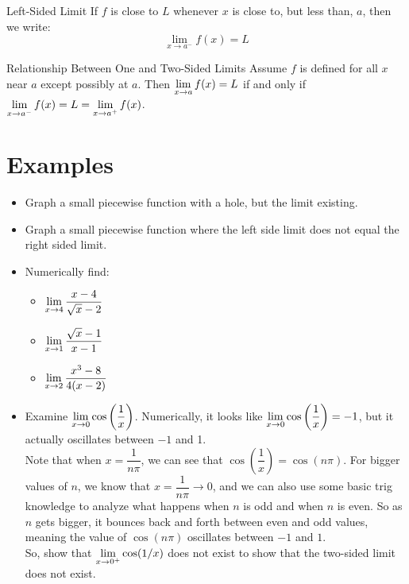 \begin{defn}{Left-Sided Limit}
If $f$ is close to $L$ whenever $x$ is close to, but less than, $a$, then we write:
\[ \lim_{x\to a^-} f(x)=L\]
\end{defn}

\begin{thm}{Relationship Between One and Two-Sided Limits}
Assume $f$ is defined for all $x$ near $a$ except possibly at $a$. Then $\displaystyle \lim_{x\to a} f(x) = L$ if and only if $\displaystyle \lim_{x\to a^-}f(x) = L = \displaystyle \lim_{x\to a^+} f(x)$.
\end{thm}

\section*{Examples}

\begin{itemize}
\item Graph a small piecewise function with a hole, but the limit existing.
\item Graph a small piecewise function where the left side limit does not equal the right sided limit.
\item Numerically find:
\begin{multicols}{3}
\begin{itemize}
  \item $\displaystyle \lim_{x\to 4} \dfrac{x-4}{\sqrt{x}-2}$
  \item $\displaystyle \lim_{x\to 1} \dfrac{\sqrt{x}-1}{x-1}$
  \item $\displaystyle \lim_{x\to 2} \dfrac{x^3-8}{4(x-2)}$
\end{itemize}
\end{multicols}
\item Examine $\displaystyle \lim_{x\to 0} \cos\left(\dfrac{1}{x}\right)$. Numerically, it looks like $\displaystyle \lim_{x\to 0} \cos\left(\dfrac{1}{x}\right)=-1$, but it actually oscillates between $-1$ and 1.\\
Note that when $x=\dfrac{1}{n\pi}$, we can see that  $\cos\left(\dfrac{1}{x}\right)=\cos(n\pi)$. For bigger values of $n$, we know that $x=\dfrac{1}{n\pi} \to 0$, and we can also use some basic trig knowledge to analyze what happens when $n$ is odd and when $n$ is even. So as $n$ gets bigger, it bounces back and forth between even and odd values, meaning the value of $\cos(n\pi)$ oscillates between $-1$ and $1$.\\

So, show that $\displaystyle \lim_{x\to0^+}\cos(1/x)$ does not exist to show that the two-sided limit does not exist.
\end{itemize}
